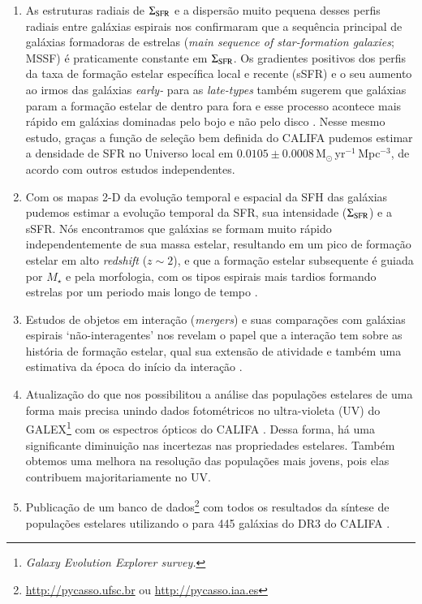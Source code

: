 \begin{enumerate}[label=(\roman*)]
  \item As estruturas radiais de $\Sigma_{\rm SFR}$ e a dispersão muito pequena desses perfis radiais entre galáxias espirais nos confirmaram que a sequência principal de galáxias formadoras de estrelas ({\em main sequence of star-formation galaxies}; MSSF) é praticamente constante em $\Sigma_{\rm SFR}$. Os gradientes positivos dos perfis da taxa de formação estelar específica local e recente (sSFR) e o seu aumento ao irmos das galáxias {\em early-} para as {\em late-types} também sugerem que galáxias param a formação estelar de dentro para fora e esse processo acontece mais rápido em galáxias dominadas pelo bojo e não pelo disco \citep{GonzalezDelgado.etal.2016a}. Nesse mesmo estudo, graças a função de seleção bem definida do CALIFA \citep{Walcher.etal.2014} pudemos estimar a densidade de SFR no Universo local em $0.0105 \pm 0.0008\,$M$_\odot\,$yr$^{-1}\,$Mpc$^{-3}$, de acordo com outros estudos independentes.
  \item Com os mapas 2-D da evolução temporal e espacial da SFH das galáxias pudemos estimar a evolução temporal da SFR, sua intensidade ($\Sigma_{\rm SFR}$) e a sSFR. Nós encontramos que galáxias se formam muito rápido independentemente de sua massa estelar, resultando em um pico de formação estelar em alto {\em redshift} ($z \sim 2$), e que a formação estelar subsequente é guiada por $M_\star$ e pela morfologia, com os tipos espirais mais tardios formando estrelas por um periodo mais longo de tempo \citep{GonzalezDelgado.etal.2017}.
  \item Estudos de objetos em interação ({\em mergers}) e suas comparações com galáxias espirais `não-interagentes' nos revelam o papel que a interação tem sobre as história de formação estelar, qual sua extensão de atividade e também uma estimativa da época do início da interação \citep{CortijoFerrero.etal.2017a, CortijoFerrero.etal.2017b, CortijoFerrero.etal.2017c}.
  \item Atualização do \starlight que nos possibilitou a análise das populações estelares de uma forma mais precisa unindo dados fotométricos no ultra-violeta (UV) do GALEX\footnote{\em Galaxy Evolution Explorer survey.} \citep{Martin.etal.2005} com os espectros ópticos do CALIFA \citep{LopezFernandez.etal.2016}. Dessa forma, há uma significante diminuição nas incertezas nas propriedades estelares. Também obtemos uma melhora na resolução das populações mais jovens, pois elas contribuem majoritariamente no UV.
  \item Publicação de um banco de dados\footnote{\href{http://pycasso.ufsc.br}{http://pycasso.ufsc.br} ou \href{http://pycasso.iaa.es}{http://pycasso.iaa.es}} com todos os resultados da síntese de populações estelares utilizando o \starlight para 445 galáxias do DR3 do CALIFA \citep{deAmorim.etal.2017}.
\end{enumerate}


